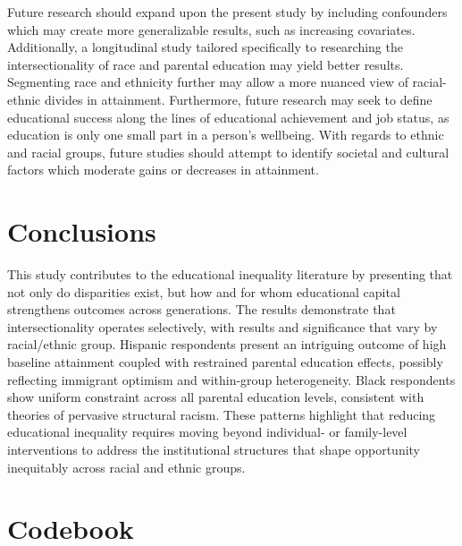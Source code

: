 \documentclass[jou,12pt,floatsintext]{apa7}
\begin{document}
Future research should expand upon the present study by including confounders which may create more generalizable results, such as increasing covariates. Additionally, a longitudinal study tailored specifically to researching the intersectionality of race and parental education may yield better results. Segmenting race and ethnicity further may allow a more nuanced view of racial-ethnic divides in attainment. Furthermore, future research may seek to define educational success along the lines of educational achievement and job status, as education is only one small part in a person's wellbeing. With regards to ethnic and racial groups, future studies should attempt to identify societal and cultural factors which moderate gains or decreases in attainment.

\section{Conclusions}

This study contributes to the educational inequality literature by presenting that not only do disparities exist, but how and for whom educational capital strengthens outcomes across generations. The results demonstrate that intersectionality operates selectively, with results and significance that vary by racial/ethnic group. Hispanic respondents present an intriguing outcome of high baseline attainment coupled with restrained parental education effects, possibly reflecting immigrant optimism and within-group heterogeneity. Black respondents show uniform constraint across all parental education levels, consistent with theories of pervasive structural racism. These patterns highlight that reducing educational inequality requires moving beyond individual- or family-level interventions to address the institutional structures that shape opportunity inequitably across racial and ethnic groups.

\printbibliography

\onecolumn
\appendix

\section{Codebook}
\end{document}
